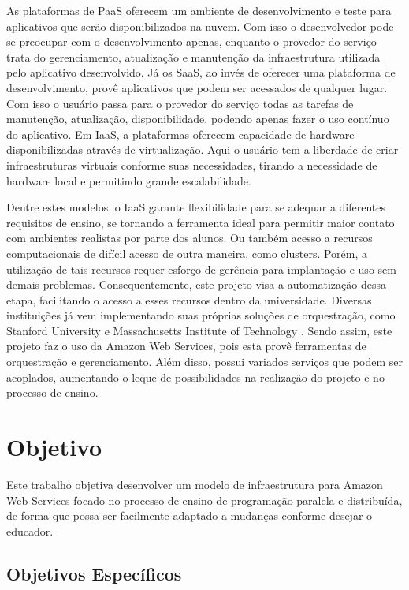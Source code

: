 \documentclass[tg]{mdtufsm}
\begin{document}
As plataformas de PaaS oferecem um ambiente de desenvolvimento e teste para aplicativos que serão disponibilizados na nuvem. Com isso o desenvolvedor pode se preocupar com o desenvolvimento apenas, enquanto o provedor do serviço trata do gerenciamento, atualização e manutenção da infraestrutura utilizada pelo aplicativo desenvolvido. Já os SaaS, ao invés de oferecer uma plataforma de desenvolvimento, provê aplicativos que podem ser acessados de qualquer lugar. Com isso o usuário passa para o provedor do serviço todas as tarefas de manutenção, atualização, disponibilidade, podendo apenas fazer o uso contínuo do aplicativo. Em IaaS, a plataformas oferecem capacidade de hardware disponibilizadas através de virtualização. Aqui o usuário tem a liberdade de criar infraestruturas virtuais conforme suas necessidades, tirando a necessidade de hardware local e permitindo grande escalabilidade.

Dentre estes modelos, o IaaS garante flexibilidade para se adequar a diferentes requisitos de ensino, se tornando a ferramenta ideal para permitir maior contato com ambientes realistas por parte dos alunos. Ou também acesso a recursos computacionais de difícil acesso de outra maneira, como clusters. Porém, a utilização de tais recursos requer esforço de gerência para implantação e uso sem demais problemas. Consequentemente, este projeto visa a automatização dessa etapa, facilitando o acesso a esses recursos dentro da universidade. Diversas instituições já vem implementando suas próprias soluções de orquestração, como Stanford University e Massachusetts Institute of Technology \cite{stanford}. Sendo assim, este projeto faz o uso da Amazon Web Services, pois esta provê ferramentas de orquestração e gerenciamento. Além disso, possui variados serviços que podem ser acoplados, aumentando o leque de possibilidades na realização do projeto e no processo de ensino.

\section{Objetivo}

Este trabalho objetiva desenvolver um modelo de infraestrutura para Amazon Web Services focado no processo de ensino de programação paralela e distribuída, de forma que possa ser facilmente adaptado a mudanças conforme desejar o educador.

\subsection{Objetivos Específicos}
\end{document}
